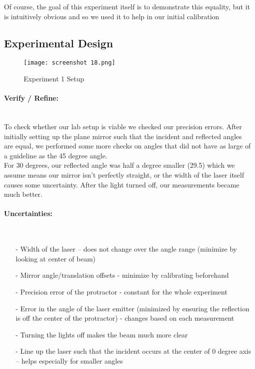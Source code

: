 \documentclass[svgnames]{article}     %
\begin{document}
Of course, the goal of this experiment itself is to demonstrate this equality,
but it is intuitively obvious and so we used it to help in our initial
calibration\\ 

\subsection{Experimental Design} 

\begin{figure}[H]
  \centering
    \texttt{[image: screenshot 18.png]}
    \caption{Experiment 1 Setup}
\end{figure}

\paragraph{Verify / Refine:} \mbox{} \\

To check whether our lab setup is viable we checked our precision errors. After
initially setting up the plane mirror such that the incident and reflected
angles are equal, we performed some more checks on angles that did not have as
large of a guideline as the 45 degree angle. \\

For 30 degrees, our reflected angle was half a degree smaller (29.5) which we
assume means our mirror isn't perfectly straight, or the width of the laser
itself causes some uncertainty. After the light turned off, our measurements
became much better. 

\paragraph{Uncertainties:} \mbox{} \\

\begin{itemize}
  \item[-] Width of the laser -- does not change over the angle range (minimize
    by looking at center of beam) 
    \item[-] Mirror angle/translation offsets - minimize by calibrating
      beforehand 
    \item[-] Precision error of the protractor - constant for the whole
      experiment 
    \item[-] Error in the angle of the laser emitter (minimized by ensuring the
      reflection is off the center of the protractor) - changes based on each
      measurement
    \item[-] Turning the lights off makes the beam much more clear
    \item[-] Line up the laser such that the incident occurs at the center of
      0 degree axis -- helps especially for smaller angles 
\end{itemize}
\end{document}
